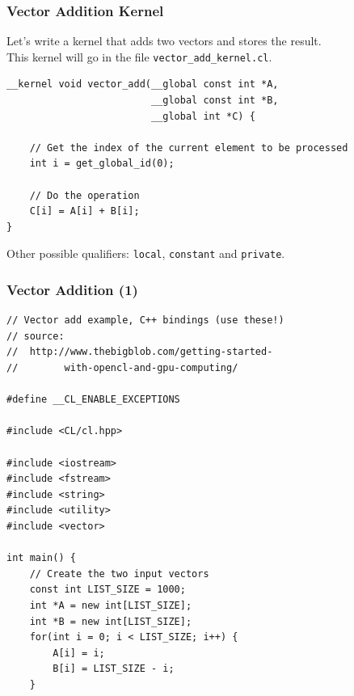 \begin{frame}[fragile]
  \frametitle{Vector Addition Kernel}


    Let's write a kernel that adds two vectors and stores the result.\\
    This kernel will go in the file {\tt vector\_add\_kernel.cl}.

  \begin{lstlisting}
__kernel void vector_add(__global const int *A,
                         __global const int *B,
                         __global int *C) {
 
    // Get the index of the current element to be processed
    int i = get_global_id(0);
 
    // Do the operation
    C[i] = A[i] + B[i];
}
  \end{lstlisting}

    Other possible qualifiers: {\tt local}, {\tt constant} and {\tt private}.


\end{frame}

\begin{frame}[fragile]
  \frametitle{Vector Addition (1)}


  \begin{lstlisting}
// Vector add example, C++ bindings (use these!)
// source:
//  http://www.thebigblob.com/getting-started-
//        with-opencl-and-gpu-computing/

#define __CL_ENABLE_EXCEPTIONS

#include <CL/cl.hpp>

#include <iostream>
#include <fstream>
#include <string>
#include <utility>
#include <vector>
 
int main() {
    // Create the two input vectors
    const int LIST_SIZE = 1000;
    int *A = new int[LIST_SIZE]; 
    int *B = new int[LIST_SIZE];
    for(int i = 0; i < LIST_SIZE; i++) {
        A[i] = i;
        B[i] = LIST_SIZE - i;
    }
  \end{lstlisting}

\end{frame}

